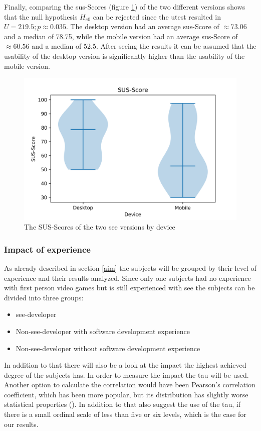 Finally, comparing the \gls{sus}-Scores (figure \ref{fig:sus-vio}) of the two different versions shows that the null hypothesis $H_{e0}$ can be rejected since the \gls{utest} resulted in $U = 219.5; p \approx 0.035$.
The desktop version had an average \gls{sus}-Score of $\approx 73.06$ and a median of 78.75, while the mobile version had an average \gls{sus}-Score of $\approx 60.56$ and a median of 52.5. 
After seeing the results it can be assumed that the \gls{usability} of the desktop version is significantly higher than the \gls{usability} of the mobile version.
\begin{figure}[htb]
  \centering
  \includegraphics[width=1\textwidth]{Evaluation/img/SUS-Score_violin.png}
  \caption{The SUS-Scores of the two \gls{see} versions by device}\label{fig:sus-vio}
\end{figure}

\subsubsection{Impact of experience}
\label{sec:experinece}
As already described in section \ref{aim} the subjects will be grouped by their level of experience and their results analyzed.
Since only one subjects had no experience with first person video games but is still experienced with \gls{see} the subjects can be divided into three groups: 
\begin{itemize}
  \item \gls{see}-developer
  \item Non-\gls{see}-developer with software development experience
  \item Non-\gls{see}-developer without software development experience
\end{itemize}
In addition to that there will also be a look at the impact the highest achieved degree of the subjects has.
In order to measure the impact the \gls{tau} will be used.
Another option to calculate the correlation would have been Pearson’s correlation coefficient, which has been more popular, but its distribution has slightly worse statistical properties (\cite{hauke2011comparison}).
In addition to that \cite{khamis2008measures} also suggest the use of the \gls{tau}, if there is a small ordinal scale of less than five or six levels, which is the case for our results.

